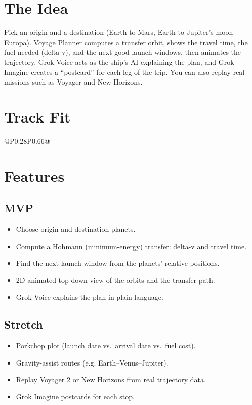 \documentclass[11pt]{article}
\begin{document}

\section{The Idea}
Pick an origin and a destination (Earth to Mars, Earth to Jupiter's moon Europa).
Voyage Planner computes a transfer orbit, shows the travel time, the fuel needed
(delta-v), and the next good launch windows, then animates the trajectory. Grok
Voice acts as the ship's AI explaining the plan, and Grok Imagine creates a
``postcard'' for each leg of the trip. You can also replay real missions such as
Voyager and New Horizons.

\section{Track Fit}
\begin{tabular}{@{}P{0.28\textwidth}P{0.66\textwidth}@{}}
\toprule
{}
\bottomrule
\end{tabular}

\section{Features}
\subsection{MVP}
\begin{itemize}
  \item Choose origin and destination planets.
  \item Compute a Hohmann (minimum-energy) transfer: delta-v and travel time.
  \item Find the next launch window from the planets' relative positions.
  \item 2D animated top-down view of the orbits and the transfer path.
  \item Grok Voice explains the plan in plain language.
\end{itemize}
\subsection{Stretch}
\begin{itemize}
  \item Porkchop plot (launch date vs.\ arrival date vs.\ fuel cost).
  \item Gravity-assist routes (e.g. Earth--Venus--Jupiter).
  \item Replay Voyager 2 or New Horizons from real trajectory data.
  \item Grok Imagine postcards for each stop.
\end{itemize}
\end{document}
